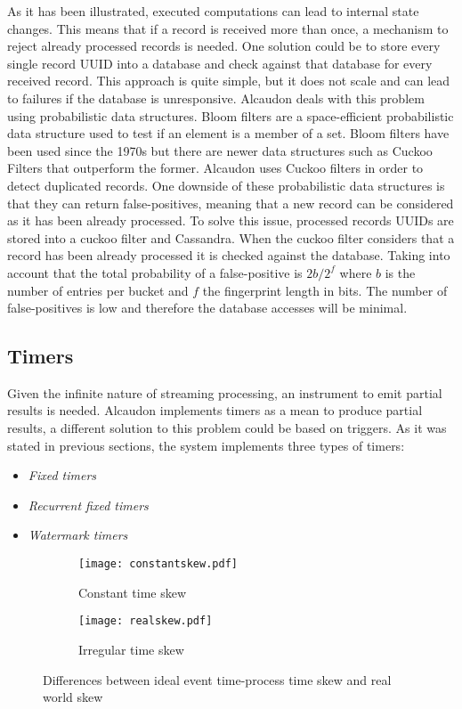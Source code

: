 As it has been illustrated, executed computations can lead to internal state
changes. This means that if a record is received more than once, a mechanism to
reject already processed records is needed. One solution could be to store every
single record \acs{UUID} into a database and check against that database for
every received record. This approach is quite simple, but it does not scale and
can lead to failures if the database is unresponsive. Alcaudon deals with this
problem using probabilistic data structures. Bloom filters are a space-efficient
probabilistic data structure used to test if an element is a member of a set.
Bloom filters have been used since the 1970s but there are newer data structures
such as Cuckoo Filters\cite{cuckoo} that outperform the former. Alcaudon uses
Cuckoo filters in order to detect duplicated records. One downside of these
probabilistic data structures is that they can return false-positives, meaning
that a new record can be considered as it has been already processed. To solve this
issue, processed records \acs{UUID}s are stored into a cuckoo filter and
Cassandra. When the cuckoo filter considers that a record has been already
processed it is checked against the database. Taking into account that the total
probability of a false-positive is $2b/2^{f}$ where $b$ is the number of entries
per bucket and $f$ the fingerprint length in bits. The number of false-positives
is low and therefore the database accesses will be minimal.

\subsection{Timers}

Given the infinite nature of streaming processing, an instrument to
emit partial results is needed. Alcaudon implements timers as a mean
to produce partial results, a different solution to this problem could
be based on triggers. As it was stated in previous sections, the system
implements three types of timers:

\begin{itemize}
\item \textit{Fixed timers}
\item \textit{Recurrent fixed timers}
\item \textit{Watermark timers}
\end{itemize}


\begin{figure}
\centering
\begin{subfigure}{.5\textwidth}
  \centering
  \texttt{[image: constantskew.pdf]}
  \caption{Constant time skew}
  \label{fig:constantskew}
\end{subfigure}%
\begin{subfigure}{.5\textwidth}
  \centering
  \texttt{[image: realskew.pdf]}
  \caption{Irregular time skew}
  \label{fig:randomskew}
\end{subfigure}
\caption{Differences between ideal event time-process time skew and real world skew}
\label{fig:skew}
\end{figure}


